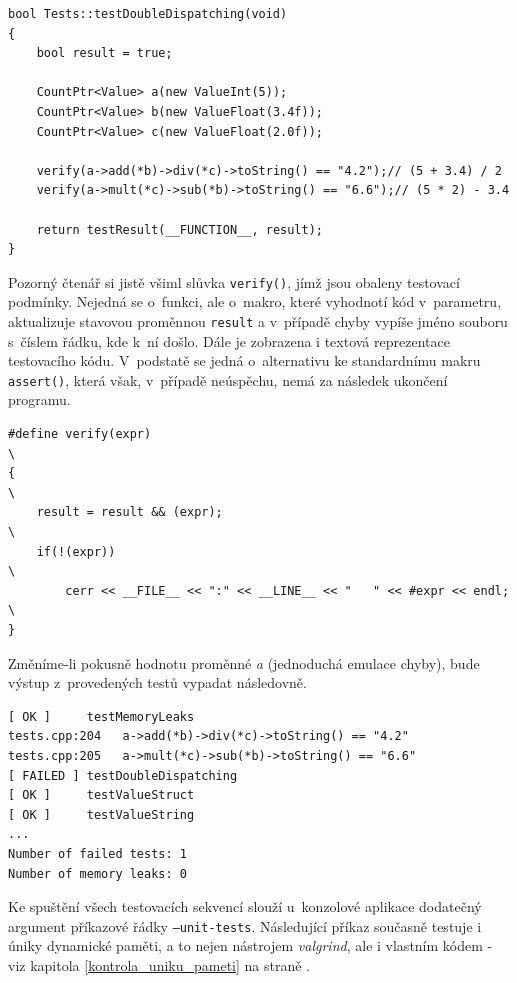\documentclass[11pt,twoside,a4paper]{book}
\begin{document}
\begin{verbatim}
bool Tests::testDoubleDispatching(void)
{
    bool result = true;

    CountPtr<Value> a(new ValueInt(5));
    CountPtr<Value> b(new ValueFloat(3.4f));
    CountPtr<Value> c(new ValueFloat(2.0f));

    verify(a->add(*b)->div(*c)->toString() == "4.2");// (5 + 3.4) / 2
    verify(a->mult(*c)->sub(*b)->toString() == "6.6");// (5 * 2) - 3.4

    return testResult(__FUNCTION__, result);
}
\end{verbatim}

Pozorný čtenář si jistě všiml slůvka \texttt{verify()}, jímž jsou obaleny testovací podmínky. Nejedná se o~funkci, ale o~makro, které vyhodnotí kód v~parametru, aktualizuje stavovou proměnnou \texttt{result} a v~případě chyby vypíše jméno souboru s~číslem řádku, kde k~ní došlo. Dále je zobrazena i textová reprezentace testovacího kódu. V~podstatě se jedná o~alternativu ke standardnímu makru \texttt{assert()}, která však, v~případě neúspěchu, nemá za následek ukončení programu.

\begin{verbatim}
#define verify(expr)                                                   \
{                                                                      \
    result = result && (expr);                                         \
    if(!(expr))                                                        \
        cerr << __FILE__ << ":" << __LINE__ << "   " << #expr << endl; \
}
\end{verbatim}

Změníme-li pokusně hodnotu proměnné \textit{a} (jednoduchá emulace chyby), bude výstup z~provedených testů vypadat ná\-sle\-dov\-ně.

\begin{verbatim}
[ OK ]     testMemoryLeaks
tests.cpp:204   a->add(*b)->div(*c)->toString() == "4.2"
tests.cpp:205   a->mult(*c)->sub(*b)->toString() == "6.6"
[ FAILED ] testDoubleDispatching
[ OK ]     testValueStruct
[ OK ]     testValueString
...
Number of failed tests: 1
Number of memory leaks: 0
\end{verbatim}

Ke spuštění všech testovacích sekvencí slouží u~konzolové aplikace dodatečný argument pří\-ka\-zo\-vé řádky \texttt{--unit-tests}. Následující příkaz současně testuje i úniky dynamické paměti, a to nejen nástrojem \textit{valgrind}, ale i vlastním kódem - viz kapitola \ref{kontrola_uniku_pameti} na straně \pageref{kontrola_uniku_pameti}.
\end{document}
